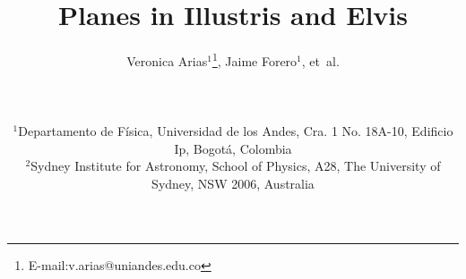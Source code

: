 \documentclass[useAMS,usenatbib]{mn2e}
\begin{document}

\title[Planes in Illustris and Elvis]{Planes in Illustris and Elvis}
\author[Arias et al.]{
{\parbox{\textwidth}{
Veronica Arias$^{1}$\thanks{E-mail:v.arias@uniandes.edu.co}, 
Jaime Forero$^1$,
et~al.\\}}
\vspace{0.1cm}\\
\parbox{\textwidth}{
$^1$Departamento de F\'isica, Universidad de los Andes, Cra. 1 No. 18A-10, Edificio Ip, Bogot\'a, Colombia\\
$^2$Sydney Institute for Astronomy, School of Physics, A28, The University of Sydney, NSW 2006, Australia \\
}}
\end{document}
